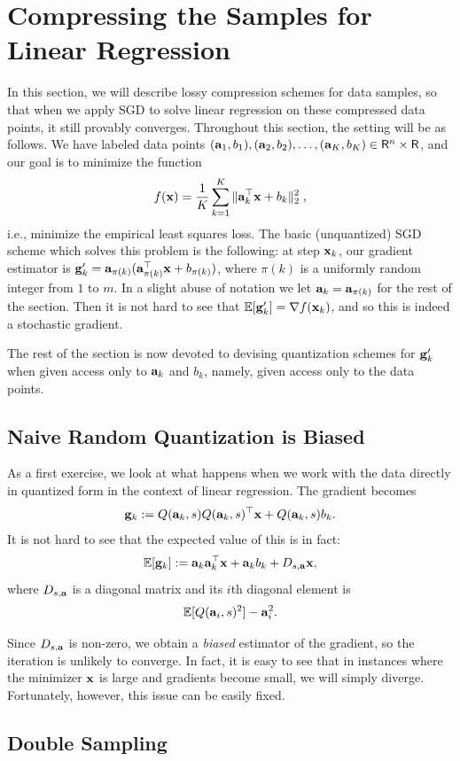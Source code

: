 \documentclass{article}
\newcommand{\R}{\mathsf{R}}
\def\a{{\bf a}}
\def\g{{\bf g}}
\def\x{{\bf x}}
\def\E{\mathbb{E}}
\begin{document}
\section{Compressing the Samples for Linear Regression}

In this section, we will describe lossy compression schemes for data samples, so that when we apply SGD to solve linear regression on these compressed data points, it still provably converges.
Throughout this section, the setting will be as follows.
We have labeled data points $(\a_1, b_1), (\a_2, b_2), \ldots, (\a_K, b_K) \in \R^n \times \R$, and our goal is to minimize the function
\[
f(\x) = \frac{1}{K} \sum_{k = 1}^K \| \a_k^\top \x + b_k \|_2^2 \; ,
\]
i.e., minimize the empirical least squares loss.
The basic (unquantized) SGD scheme which solves this problem is the following: at step $\x_k$, our gradient estimator is $\g'_k = \a_{\pi(k)} (\a_{\pi(k)}^\top \x + b_{\pi(k)})$, where $\pi(k)$ is a uniformly random integer from $1$ to $m$.
In a slight abuse of notation we let $\a_k = \a_{\pi(k)}$ for the rest of the section.
Then it is not hard to see that $\E [\g'_k] = \nabla f(\x_k)$, and so this is indeed a stochastic gradient.

The rest of the section is now devoted to devising quantization schemes for $\g'_k$ when given access only to $\a_k$ and $b_k$, namely, given access only to the data points.

\subsection{Naive Random Quantization is Biased}

As a first exercise, we look at what happens when we work with the data directly in quantized form in the context of linear regression. 
The gradient becomes
\[
\g_k := Q(\a_k, s ) Q(\a_k, s)^\top \x + Q(\a_k, s) b_k.
\]
It is not hard to see that the expected value of this is in fact: 
\[
\E[\g_k] := \a_k \a_k^\top \x + \a_k b_k + D_{s, \a} \x, 
\]
where $D_{s, \a}$ is a diagonal matrix and its $i$th diagonal element is 
\[
\E[ Q(\a_i, s)^2 ] - \a_i^2.
\]

Since $D_{s, \a}$ is non-zero, we obtain a \emph{biased} estimator of the gradient, so the iteration is unlikely to converge. 
In fact, it is easy to see that in instances where the minimizer $\x$ is large and gradients become small, we will simply diverge. 
Fortunately, however, this issue can be easily fixed. 

\subsection{Double Sampling}
\end{document}

